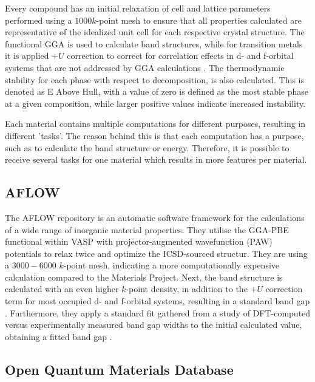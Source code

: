 
Every compound has an initial relaxation of cell and lattice parameters performed using a $1000 k$-point mesh to ensure that all properties calculated are representative of the idealized unit cell for each respective crystal structure. The functional GGA is used to calculate band structures, while for transition metals it is applied $+U$ correction to correct for correlation effects in d- and f-orbital systems that are not addressed by GGA calculations \cite{Wang2006}. The thermodynamic stability for each phase with respect to decomposition, is also calculated. This is denoted as E Above Hull, with a value of zero is defined as the most stable phase at a given composition, while larger positive values indicate increased instability.

Each material contains multiple computations for different purposes, resulting in different 'tasks'. The reason behind this is that each computation has a purpose, such as to calculate the band structure or energy. Therefore, it is possible to receive several tasks for one material which results in more features per material.

\subsection{AFLOW}

The AFLOW\cite{Curtarolo2012, Curtarolo2012a, Calderon2015} repository is an automatic software framework for the calculations of a wide range of inorganic material properties. They utilise the GGA-PBE functional within VASP with projector-augmented wavefunction (PAW) potentials to relax twice and optimize the ICSD-sourced structur. They are using a $3000-6000$ $k$-point mesh, indicating a more computationally expensive calculation compared to the Materials Project. Next, the band structure is calculated with an even higher $k$-point density, in addition to the $+U$ correction term for most occupied d- and f-orbital systems, resulting in a standard band gap \cite{Setyawan2010}. Furthermore, they apply a standard fit gathered from a study of DFT-computed versus experimentally measured band gap widths to the initial calculated value, obtaining a fitted band gap \cite{Setyawan2011}.

\subsection{Open Quantum Materials Database}

